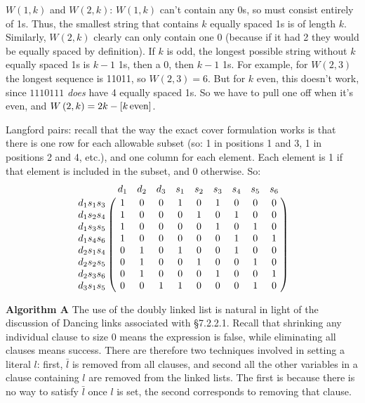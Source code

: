  $W\left(1, k\right)$ and $W\left(2, k\right)$: $W\left(1,k\right)$
can't contain any 0s, so must consist entirely of 1s.  Thus, the smallest
string that contains $k$ equally spaced 1s is of length $k$.  
Similarly, $W\left(2, k\right)$ clearly can only contain one 0 (because
if it had 2 they would be equally spaced by definition).  If $k$
is odd, the longest possible string without $k$ equally spaced 1s 
is $k-1$ 1s, then a 0, then $k-1$ 1s.  For example, for
$W\left(2, 3\right)$ the longest sequence is 11011, so
$W\left(2, 3\right) = 6$.  But for $k$ even, this doesn't
work, since $1110111$ {\it does} have 4 equally spaced 1s.
So we have to pull one off when it's even, and
$W\left(2, k\right) = 2 k - \left[ k\, {\rm even} \right]$.


 Langford pairs: recall that the way the exact cover
formulation works is that there is one row for each allowable subset
(so: 1 in positions 1 and 3, 1 in positions 2 and 4, etc.), and one
column for each element.  Each element is 1 if that element
is included in the subset, and 0 otherwise.  So:
$$
 \bordermatrix{
  ~                   & d_1 & d_2 & d_3 & s_1 & s_2 & s_3 & s_4 & s_5 & s_6 \cr
   d_1 s_1 s_3 & 1    & 0     & 0     & 1     & 0     & 1     & 0     & 0     & 0    \cr
   d_1 s_2 s_4 & 1    & 0     & 0     & 0     & 1     & 0     & 1     & 0     & 0    \cr
   d_1 s_3 s_5 & 1    & 0     & 0     & 0     & 0     & 1     & 0     & 1     & 0    \cr
   d_1 s_4 s_6 & 1    & 0     & 0     & 0     & 0     & 0     & 1     & 0     & 1    \cr
   d_2 s_1 s_4 & 0    & 1     & 0     & 1     & 0     & 0     & 1     & 0     & 0    \cr
   d_2 s_2 s_5 & 0    & 1     & 0     & 0     & 1     & 0     & 0     & 1     & 0    \cr
   d_2 s_3 s_6 & 0    & 1     & 0     & 0     & 0     & 1     & 0     & 0     & 1    \cr
   d_3 s_1 s_5 & 0    & 0     & 1     & 1     & 0     & 0     & 0     & 1     & 0    \cr
 } 
$$


 {\bf Algorithm A}\hfil\break
The use of the doubly linked list is
natural in light of the discussion of Dancing links associated with 
\S 7.2.2.1.  Recall that shrinking any individual
clause to size 0 means the expression is false, while eliminating
all clauses means success.  There are therefore two techniques involved
in setting a literal $l$: first, $\bar l$ is removed from all clauses, and
second all the other variables in a clause containing $l$ are removed
from the linked lists.  The first is because there is no way to satisfy
$\bar l$ once $l$ is set, the second corresponds to removing that clause.

